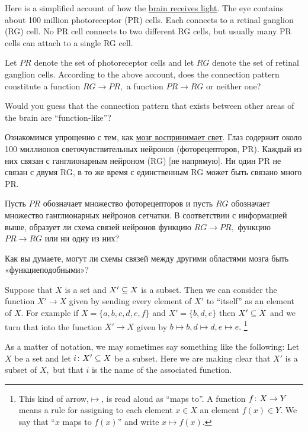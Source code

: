 \documentclass[../main/CT4S-EN-RU]{subfiles}
\begin{document}
\begin{exerciseENG}
Here is a simplified account of how the \href{http://en.wikipedia.org/wiki/Retina}{\text brain receives light}. The eye contains about 100 million photoreceptor (PR) cells. Each connects to a retinal ganglion (RG) cell. No PR cell connects to two different RG cells, but usually many PR cells can attach to a single RG cell. 

Let $PR$ denote the set of photoreceptor cells and let $RG$ denote the set of retinal ganglion cells. 
\sexc According to the above account, does the connection pattern constitute a function $RG\to PR,$ a function $PR\to RG$ or neither one? 
\item Would you guess that the connection pattern that exists between other areas of the brain are “function-like”?
\endsexc
\end{exerciseENG}

\begin{exerciseRUS}
Ознакомимся упрощенно с тем, как \href{https://ru.wikipedia.org/wiki/%D0%A1%D0%B5%D1%82%D1%87%D0%B0%D1%82%D0%BA%D0%B0}{\text мозг воспринимает свет}. Глаз содержит около 100 миллионов светочувствительных нейронов (фоторецепторов, PR). Каждый из них связан с ганглионарным нейроном (RG) [не напрямую]. Ни один PR не связан с двумя RG, в то же время с единственным RG может быть связано много PR.

Пусть $PR$ обозначает множество фоторецепторов и пусть $RG$ обозначает множество ганглионарных нейронов сетчатки. 
\sexc В соответствии с информацией выше, образует ли схема связей нейронов функцию $RG\to PR,$ функцию $PR\to RG$ или ни одну из них? 
\item Как вы думаете, могут ли схемы связей между другими областями мозга быть «функциеподобными»? 
\endsexc 
\end{exerciseRUS}

\begin{exampleENG}\label{ex:subset as function}
Suppose that $X$ is a set and $X'\ss X$ is a subset. Then we can consider the function $X'\to X$ given by sending every element of $X'$ to “itself” as an element of $X.$ For example if $X=\{a,b,c,d,e,f\}$ and $X'=\{b,d,e\}$ then $X'\ss X$ and we turn that into the function $X'\to X$ given by $b\mapsto b, d\mapsto d, e\mapsto e.$%
\footnote{This kind of arrow,\;\;$\mapsto$\;\;, is read aloud as “maps to”. A function $f\taking X\to Y$ means a rule for assigning to each element $x\in X$ an element $f(x)\in Y.$ We say that “$x$ maps to $f(x)$” and write $x\mapsto f(x).$}

As a matter of notation, we may sometimes say something like the following: Let $X$ be a set and let $i\taking X'\ss X$ be a subset. Here we are making clear that $X'$ is a subset of $X,$ but that $i$ is the name of the associated function.
\end{exampleENG}
\end{document}

